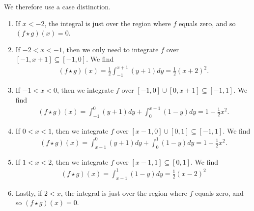 \documentclass[11pt]{article}
\begin{document}
\begin{solution}
\begin{itemize}
        We therefore use a case distinction. 
        \begin{enumerate}
            \item If $x < -2$, the integral is just over the region where $f$ equals zero,
            and so $( f \star g )(x) = 0$.
            \item If $-2 < x < -1$, then we only need to integrate $f$ over $[-1,x+1] \subseteq [-1,0]$. We find 
            \begin{align}
                (f \star g)(x) = \frac 1 2 \int_{-1}^{x + 1} (y + 1) dy = \frac 1 2 (x + 2)^2.
            \end{align}
            \item If $-1 < x < 0$, then we integrate $f$ over $[-1,0] \cup [0,x+1] \subseteq [-1,1]$. We find 
            \begin{align}
                (f \star g)(x) = \int_{-1}^{0} (y + 1) dy + \int_{0}^{x + 1} (1 - y) dy =  1 - \frac 1 2 x^2.
            \end{align}
            \item If $0 < x < 1$, then we integrate $f$ over $[x-1,0] \cup [0,1] \subseteq [-1,1]$. We find 
            \begin{align}
                (f \star g)(x) = \int_{x - 1}^{0} (y + 1) dy + \int_{0}^{1} (1 - y) dy = 1 - \frac 1 2 x^2.
            \end{align}
            \item If $1 < x < 2$, then we integrate $f$ over $[x-1,1] \subseteq [0,1]$. We find 
            \begin{align}
                (f \star g)(x) = \int_{x - 1}^{1} (1 - y) dy = \frac 1 2 ( x - 2)^2
            \end{align}
            \item Lastly, if $2 < x$, the integral is just over the region where $f$ equals zero, 
            and so $( f \star g )(x) = 0$.
        \end{enumerate}



\end{itemize}
\end{solution}
\end{document}
